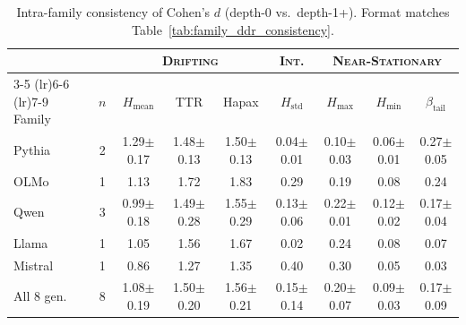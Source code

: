 \begin{table}[t]
\centering
\caption{Intra-family consistency of Cohen's $d$ (depth-0 vs.\ depth-1+). Format matches Table~\ref{tab:family_ddr_consistency}.}
\label{tab:family_cohens_d}
\small
\setlength{\tabcolsep}{3.5pt}
\begin{tabular}{l c ccc c ccc}
\toprule
 & & \multicolumn{3}{c}{\textsc{Drifting}} & \textsc{Int.} & \multicolumn{3}{c}{\textsc{Near-Stationary}} \\
\cmidrule(lr){3-5} \cmidrule(lr){6-6} \cmidrule(lr){7-9}
Family & $n$ & $H_{\mathrm{mean}}$ & TTR & Hapax & $H_{\mathrm{std}}$ & $H_{\mathrm{max}}$ & $H_{\mathrm{min}}$ & $\beta_{\mathrm{tail}}$ \\
\midrule
Pythia & 2 & 1.29\tiny{$\pm$0.17} & 1.48\tiny{$\pm$0.13} & 1.50\tiny{$\pm$0.13} & 0.04\tiny{$\pm$0.01} & 0.10\tiny{$\pm$0.03} & 0.06\tiny{$\pm$0.01} & 0.27\tiny{$\pm$0.05} \\
OLMo & 1 & 1.13 & 1.72 & 1.83 & 0.29 & 0.19 & 0.08 & 0.24 \\
Qwen & 3 & 0.99\tiny{$\pm$0.18} & 1.49\tiny{$\pm$0.28} & 1.55\tiny{$\pm$0.29} & 0.13\tiny{$\pm$0.06} & 0.22\tiny{$\pm$0.01} & 0.12\tiny{$\pm$0.02} & 0.17\tiny{$\pm$0.04} \\
Llama & 1 & 1.05 & 1.56 & 1.67 & 0.02 & 0.24 & 0.08 & 0.07 \\
Mistral & 1 & 0.86 & 1.27 & 1.35 & 0.40 & 0.30 & 0.05 & 0.03 \\
\midrule
\rowcolor{gray!10}
All 8 gen. & 8 & 1.08\tiny{$\pm$0.19} & 1.50\tiny{$\pm$0.20} & 1.56\tiny{$\pm$0.21} & 0.15\tiny{$\pm$0.14} & 0.20\tiny{$\pm$0.07} & 0.09\tiny{$\pm$0.03} & 0.17\tiny{$\pm$0.09} \\
\bottomrule
\end{tabular}
\end{table}